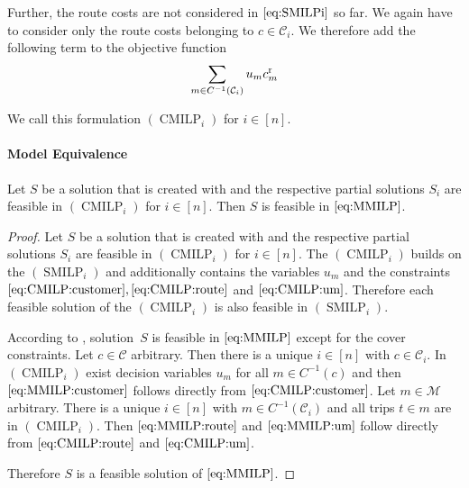 Further, the route costs are not considered in $\eqref{eq:SMILPi}$ so far. We again have to consider only the route costs belonging to $c\in\mathcal{C}_i$. We therefore add the following term to the objective function
\begin{align*}
	\sum_{m\in C^{-1}\left(\mathcal{C}_i\right)} u_m c^{\operatorname{r}}_m
\end{align*}

We call this formulation $(\operatorname{CMILP}_i)$ for $i\in[n]$.

\paragraph{Model Equivalence} \parfill

\begin{theorem}

Let $S$ be a solution that is created with  and the respective partial solutions $S_i$ are feasible in $(\operatorname{CMILP}_i)$ for ${i\in[n]}$. Then $S$ is feasible in $\eqref{eq:MMILP}$.

\end{theorem}

\begin{proof}

Let $S$ be a solution that is created with  and the respective partial solutions $S_i$ are feasible in $(\operatorname{CMILP}_i)$ for ${i\in[n]}$. The $(\operatorname{CMILP}_i)$ builds on the $(\operatorname{SMILP}_i)$ and additionally contains the variables $u_m$ and the constraints $\eqref{eq:CMILP:customer}, \eqref{eq:CMILP:route}$ and $\eqref{eq:CMILP:um}$. Therefore each feasible solution of the $(\operatorname{CMILP}_i)$ is also feasible in $(\operatorname{SMILP}_i)$.

According to , solution~$S$ is feasible in $\eqref{eq:MMILP}$ except for the cover constraints. Let $c\in\mathcal{C}$ arbitrary. Then there is a unique $i\in[n]$ with ${c\in\mathcal{C}_i}$. In $(\operatorname{CMILP}_i)$ exist decision variables $u_m$ for all ${m\in C^{-1}(c)}$ and then $\eqref{eq:MMILP:customer}$ follows directly from $\eqref{eq:CMILP:customer}$. Let ${m\in\mathcal{M}}$ arbitrary. There is a unique ${i\in[n]}$ with ${m\in C^{-1}(\mathcal{C}_i)}$ and all trips ${t\in m}$ are in $(\operatorname{CMILP}_i)$. Then $\eqref{eq:MMILP:route}$ and $\eqref{eq:MMILP:um}$ follow directly from $\eqref{eq:CMILP:route}$ and $\eqref{eq:CMILP:um}$. 

Therefore $S$ is a feasible solution of $\eqref{eq:MMILP}$.

\end{proof}

